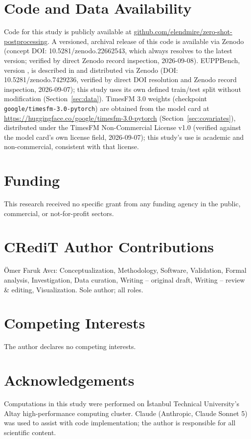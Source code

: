 \section*{Code and Data Availability}

Code for this study is publicly available at
\href{https://github.com/elendmire/zero-shot-postprocessing}{github.com/elendmire/zero-shot-postprocessing}.
A versioned, archival release of this code is available via Zenodo
(concept DOI: 10.5281/zenodo.22662543, which always resolves to the
latest version; verified by direct Zenodo record inspection, 2026-09-08).
EUPPBench, version \EuppbenchVersion{}, is described in
\citet{demaeyer_2023_euppbench} and distributed via Zenodo (DOI:
10.5281/zenodo.7429236, verified by direct DOI resolution and Zenodo
record inspection, 2026-09-07); this study uses its own defined
train/test split without modification (Section~\ref{sec:data}). TimesFM
3.0 weights (checkpoint \texttt{google/timesfm-3.0-pytorch}) are obtained
from the model card at
\url{https://huggingface.co/google/timesfm-3.0-pytorch} (Section~\ref{sec:covariates}),
distributed under the TimesFM Non-Commercial License v1.0 (verified
against the model card's own license field, 2026-09-07); this study's use
is academic and non-commercial, consistent with that license.

\section*{Funding}

This research received no specific grant from any funding agency in the
public, commercial, or not-for-profit sectors.

\section*{CRediT Author Contributions}

\"{O}mer Faruk Avc{\i}: Conceptualization, Methodology, Software,
Validation, Formal analysis, Investigation, Data curation, Writing --
original draft, Writing -- review \& editing, Visualization. Sole author;
all roles.

\section*{Competing Interests}

The author declares no competing interests.

\section*{Acknowledgements}

Computations in this study were performed on \.{I}stanbul Technical
University's Altay high-performance computing cluster. Claude (Anthropic,
Claude Sonnet 5) was used to assist with code implementation; the author
is responsible for all scientific content.
